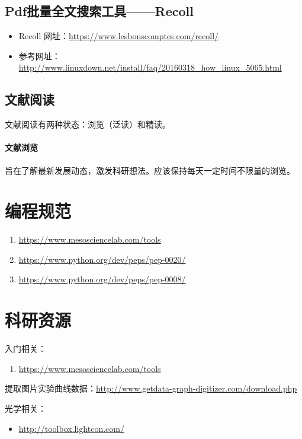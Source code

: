 \subsection{Pdf批量全文搜索工具——Recoll}
\begin{itemize}
\item Recoll 网址：\url{https://www.lesbonscomptes.com/recoll/}

\item 参考网址：\url{http://www.linuxdown.net/install/faq/20160318_how_linux_5065.html}
\end{itemize}


\subsection{文献阅读}
文献阅读有两种状态：浏览（泛读）和精读。

\paragraph{文献浏览}旨在了解最新发展动态，激发科研想法。应该保持每天一定时间不限量的浏览。



\section{编程规范}
\begin{enumerate}
\item \url{https://www.mesosciencelab.com/tools}

\item \url{https://www.python.org/dev/peps/pep-0020/}

\item \url{https://www.python.org/dev/peps/pep-0008/}
\end{enumerate}



\section{科研资源}
入门相关：
\begin{enumerate}
\item \url{https://www.mesosciencelab.com/tools}
\end{enumerate}


提取图片实验曲线数据：\url{http://www.getdata-graph-digitizer.com/download.php}

光学相关：
 \begin{itemize}
\item \url{http://toolbox.lightcon.com/}
\end{itemize}


